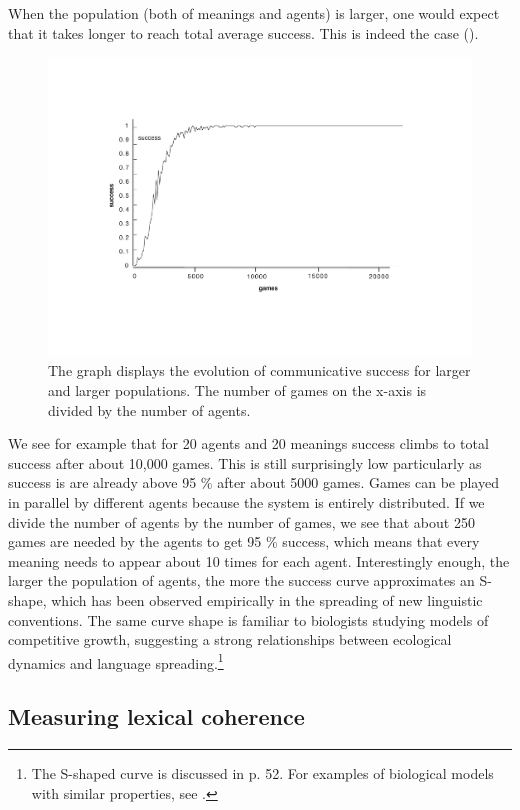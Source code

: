 When the population (both of meanings and agents) is larger, 
one would expect that it takes longer to reach total average
success. This is indeed the case (). 

\begin{figure}[htbp]
  \centerline{\includegraphics[width=\textwidth]{chap5/figs/larger.pdf}}
\caption{\label{larger}The graph displays the evolution of communicative success
for larger and larger populations. The
number of games on the x-axis
is divided by the number of agents. }
\end{figure}
We see for example that for 20 agents and 20 meanings 
success climbs to total success after about 10,000 games.
This is still surprisingly low particularly as
success is
are already above 95 \% after about 5000 games. Games can be played
in parallel by different agents because the system 
is entirely distributed. If we divide
the number of agents by the number of games, we see that about 250
games are needed by the agents to get 95 \% success, which means
that every meaning needs to appear about 10 times for each agent. 
Interestingly enough, the larger the population of agents, 
the more the success curve approximates an 
S-shape, which has 
been observed empirically in the spreading of new
linguistic conventions. The same curve shape is familiar to
biologists studying models of competitive growth, suggesting 
a strong relationships between ecological dynamics and language
spreading.\footnote{The S-shaped curve is discussed in \cite{McMahon:1994} p. 52. For examples
of biological models with similar properties, see \cite{May:1976}.}

\subsection{Measuring lexical coherence} 

